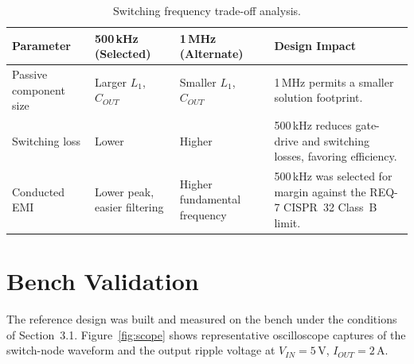 \documentclass[11pt,a4paper]{article}
\begin{document}
\begin{table}[H]
\centering
\small
\begin{tabularx}{\linewidth}{@{}p{3.0cm} p{2.6cm} p{2.6cm} X@{}}
\toprule
\textbf{Parameter} & \textbf{500\,kHz (Selected)} & \textbf{1\,MHz (Alternate)} & \textbf{Design Impact} \\
\midrule
Passive component size & Larger $L_1$, $C_{OUT}$ & Smaller $L_1$, $C_{OUT}$ & 1\,MHz permits a smaller solution footprint. \\
Switching loss & Lower & Higher & 500\,kHz reduces gate-drive and switching losses, favoring efficiency. \\
Conducted EMI & Lower peak, easier filtering & Higher fundamental frequency & 500\,kHz was selected for margin against the REQ-7 CISPR~32 Class~B limit. \\
\bottomrule
\end{tabularx}
\caption{Switching frequency trade-off analysis.}
\label{tab:tradeoff-f}
\end{table}

\section{Bench Validation}
The reference design was built and measured on the bench under the conditions
of Section~3.1. Figure~\ref{fig:scope} shows representative oscilloscope
captures of the switch-node waveform and the output ripple voltage at
$V_{IN} = 5$\,V, $I_{OUT} = 2$\,A.
\end{document}
